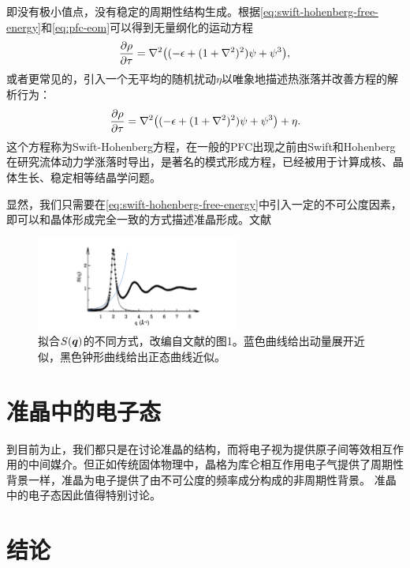 \documentclass[hyperref, UTF8, a4paper]{ctexart}
\begin{document}
即没有极小值点，没有稳定的周期性结构生成。根据\eqref{eq:swift-hohenberg-free-energy}和\eqref{eq:pfc-eom}可以得到无量纲化的运动方程
\[
    \pdv{\rho}{\tau} = \laplacian ((- \epsilon + (1 + \laplacian)^2) \psi + \psi^3),
\]
或者更常见的，引入一个无平均的随机扰动$\eta$以唯象地描述热涨落并改善方程的解析行为\cite{PhysRevLett.88.245701}：
\begin{equation}
    \pdv{\rho}{\tau} = \laplacian ((- \epsilon + (1 + \laplacian)^2) \psi + \psi^3) + \eta.
\end{equation}
这个方程称为Swift-Hohenberg方程，在一般的PFC出现之前由Swift和Hohenberg在研究流体动力学涨落时导出\cite{PhysRevA.15.319}，是著名的模式形成方程\cite{phasediffusion2012}，已经被用于计算成核、晶体生长、稳定相等结晶学问题\cite{PhysRevLett.88.245701,PhysRevE.70.051605}。%

显然，我们只需要在\eqref{eq:swift-hohenberg-free-energy}中引入一定的不可公度因素，即可以和晶体形成完全一致的方式描述准晶形成。文献

\begin{figure}
    \centering
    \includegraphics[width=0.6\textwidth]{sq-adapted.png}
    \caption{拟合$S(\vb*{q})$的不同方式，改编自文献\cite{PhysRevE.70.051605}的图1。蓝色曲线给出动量展开近似，黑色钟形曲线给出正态曲线近似。}
    \label{fig:sq-fitting}
\end{figure}

\section{准晶中的电子态}

到目前为止，我们都只是在讨论准晶的结构，而将电子视为提供原子间等效相互作用的中间媒介。但正如传统固体物理中，晶格为库仑相互作用电子气提供了周期性背景一样，准晶为电子提供了由不可公度的频率成分构成的非周期性背景。
准晶中的电子态因此值得特别讨论。

\section{结论}


 
\end{document}
